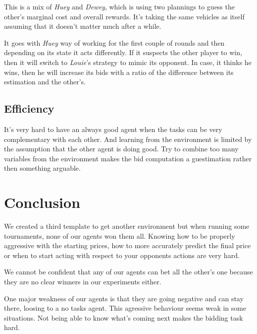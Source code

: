 \documentclass[11pt,a4paper]{article}
\begin{document}
This is a mix of \emph{Huey} and \emph{Dewey}, which is using two plannings
to guess the other's marginal cost and overall rewards. It's taking the same
vehicles as itself assuming that it doesn't matter much after a while.

It goes with \emph{Huey} way of working for the first couple of rounds and then
depending on its state it acts differently. If it suspects the other player to
win, then it will switch to \emph{Louie}'s strategy to mimic its opponent. In
case, it thinks he wins, then he will increase its bids with a ratio of the
difference between its estimation and the other's.

\subsection*{Efficiency}

It's very hard to have an always good agent when the tasks can be very
complementary with each other. And learning from the environment is limited by
the assumption that the other agent is doing good. Try to combine too many
variables from the environment makes the bid computation a guestimation rather
then something arguable.


\section*{Conclusion}

We created a third template to get another environment but when running some
tournaments, none of our agents won them all. Knowing how to be properly
aggressive with the starting prices, how to more accurately predict the final
price or when to start acting with respect to your opponents actions are very
hard.

We cannot be confident that any of our agents can bet all the other's one
because they are no clear winners in our experiments either.

One major weakness of our agents is that they are going negative and can stay
there, loosing to a no tasks agent. This agressive behaviour seems weak in some
situations. Not being able to know what's coming next makes the bidding task
hard.
\end{document}
